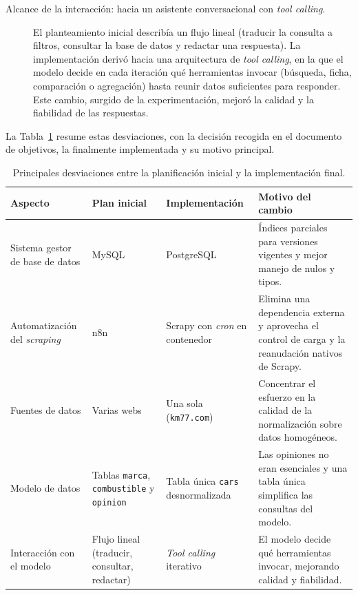 \begin{description}
  \item[Alcance de la interacción: hacia un asistente conversacional con
        \emph{tool calling}.] El planteamiento inicial describía un flujo lineal
        (traducir la consulta a filtros, consultar la base de datos y redactar una
        respuesta). La implementación derivó hacia una arquitectura de \emph{tool
        calling}, en la que el modelo decide en cada iteración qué herramientas
        invocar (búsqueda, ficha, comparación o agregación) hasta reunir datos
        suficientes para responder. Este cambio, surgido de la experimentación,
        mejoró la calidad y la fiabilidad de las respuestas.
\end{description}

La Tabla~\ref{tab:plan-vs-real} resume estas desviaciones, con la decisión
recogida en el documento de objetivos, la finalmente implementada y su motivo
principal.

\begin{table}[H]
\centering
\renewcommand{\arraystretch}{1.3}
\begin{tabular}{p{2.6cm}p{2.6cm}p{2.7cm}p{4.0cm}}
\hline
\textbf{Aspecto} & \textbf{Plan inicial} & \textbf{Implementación} & \textbf{Motivo del cambio} \\
\hline
Sistema gestor de base de datos &
MySQL &
PostgreSQL &
Índices parciales para versiones vigentes y mejor manejo de nulos y tipos. \\

Automatización del \emph{scraping} &
n8n &
Scrapy con \emph{cron} en contenedor &
Elimina una dependencia externa y aprovecha el control de carga y la reanudación nativos de Scrapy. \\

Fuentes de datos &
Varias webs &
Una sola (\texttt{km77.com}) &
Concentrar el esfuerzo en la calidad de la normalización sobre datos homogéneos. \\

Modelo de datos &
Tablas \texttt{marca}, \texttt{combustible} y \texttt{opinion} &
Tabla única \texttt{cars} desnormalizada &
Las opiniones no eran esenciales y una tabla única simplifica las consultas del modelo. \\

Interacción con el modelo &
Flujo lineal (traducir, consultar, redactar) &
\emph{Tool calling} iterativo &
El modelo decide qué herramientas invocar, mejorando calidad y fiabilidad. \\
\hline
\end{tabular}
\caption{Principales desviaciones entre la planificación inicial y la
implementación final.}
\label{tab:plan-vs-real}
\end{table}

